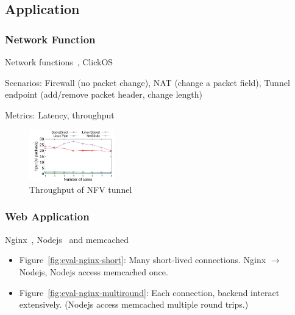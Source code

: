\subsection{Application}
\label{sec:application}

\subsubsection{Network Function}

Network functions~\cite{li2016clicknp}, ClickOS~\cite{martins2014clickos}

Scenarios: Firewall (no packet change), NAT (change a packet field), Tunnel endpoint (add/remove packet header, change length)

Metrics: Latency, throughput

\begin{figure}[htpb]
	\centering
	\includegraphics[width=0.33\textwidth]{eval/microbenchmark/nfv-tun-tput.pdf}
	\caption{Throughput of NFV tunnel}
	\label{fig:eval-tun-tput}
\end{figure}



\subsubsection{Web Application}

Nginx~\cite{nginx}, Nodejs~\cite{nodejs} and memcached~\cite{memcached}

\begin{itemize}
	\item Figure~\ref{fig:eval-nginx-short}: Many short-lived connections. Nginx $\rightarrow$ Nodejs, Nodejs access memcached once.
	\item Figure~\ref{fig:eval-nginx-multiround}: Each connection, backend interact extensively. (Nodejs access memcached multiple round trips.)
\end{itemize}

